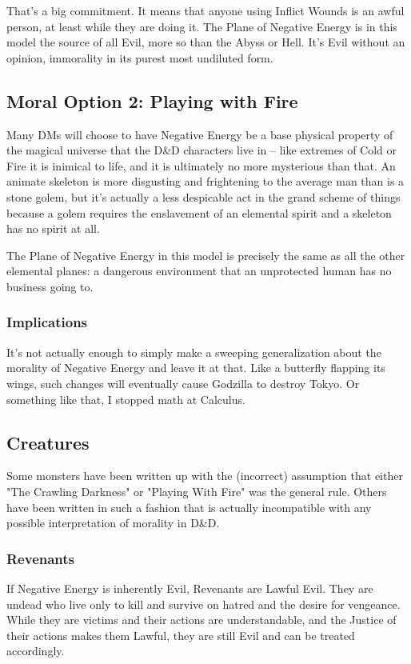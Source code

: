 That's a big commitment. It means that anyone using Inflict Wounds is an awful person, at least while they are doing it. The Plane of Negative Energy is in this model the source of all Evil, more so than the Abyss or Hell. It's Evil without an opinion, immorality in its purest most undiluted form.

\subsection{Moral Option 2: Playing with Fire}

Many DMs will choose to have Negative Energy be a base physical property of the magical universe that the D\&D characters live in -- like extremes of Cold or Fire it is inimical to life, and it is ultimately no more mysterious than that. An animate skeleton is more disgusting and frightening to the average man than is a stone golem, but it's actually a less despicable act in the grand scheme of things because a golem requires the enslavement of an elemental spirit and a skeleton has no spirit at all.

The Plane of Negative Energy in this model is precisely the same as all the other elemental planes: a dangerous environment that an unprotected human has no business going to.

\subsubsection{Implications}

It's not actually enough to simply make a sweeping generalization about the morality of Negative Energy and leave it at that. Like a butterfly flapping its wings, such changes will eventually cause Godzilla to destroy Tokyo. Or something like that, I stopped math at Calculus.

\subsection{Creatures}

Some monsters have been written up with the (incorrect) assumption that either "The Crawling Darkness" or "Playing With Fire" was the general rule. Others have been written in such a fashion that is actually incompatible with any possible interpretation of morality in D\&D.

\subsubsection{Revenants} If Negative Energy is inherently Evil, Revenants are Lawful Evil. They are undead who live only to kill and survive on hatred and the desire for vengeance. While they are victims and their actions are understandable, and the Justice of their actions makes them Lawful, they are still Evil and can be treated accordingly.

